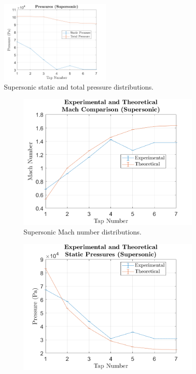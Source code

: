 \documentclass[runningheads]{llncs}
\begin{document}
\begin{figure}[h]
    \centering
    \includegraphics[width  = 0.49\textwidth]{figures/supersonic_pressure_distributions.png}
    \caption{Supersonic static and total pressure distributions.}
    \label{fig:supersonic_pressure}
\end{figure}

\begin{figure}[h]
    \centering
    \begin{subfigure}{0.49\textwidth}
    \includegraphics[width=\textwidth]{figures/supersonic_Mach_distributions.png}
    \caption{Supersonic Mach number distributions.}
    \label{fig:supersonic_Mach}
    \end{subfigure}
    \hfill
    \begin{subfigure}{0.49\textwidth}
    \includegraphics[width=\textwidth]{figures/supersonic_pressure_distribution_exp_vs_thy.png}

\end{subfigure}
\end{figure}
\end{document}
